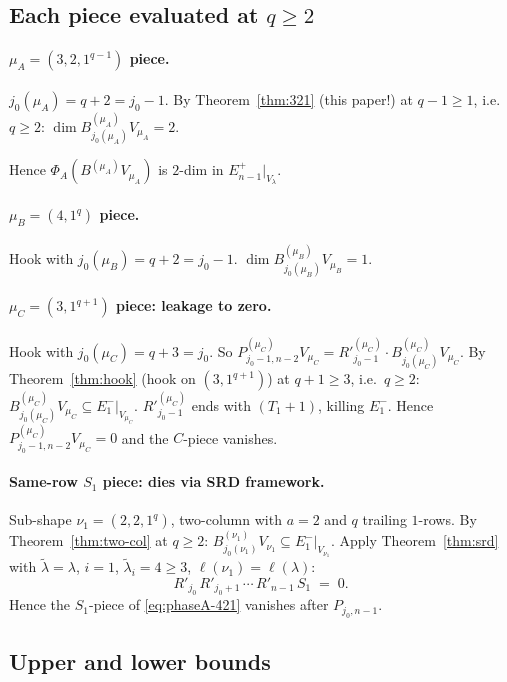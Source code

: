 \documentclass[11pt]{article}
\theoremstyle{definition}
\begin{document}
\subsection{Each piece evaluated at $q \ge 2$}

\paragraph{$\mu_A = (3, 2, 1^{q-1})$ piece.}
$j_0(\mu_A) = q + 2 = j_0 - 1$. By Theorem~\ref{thm:321} (this paper!)
at $q - 1 \ge 1$, i.e.\ $q \ge 2$:
$\dim B^{(\mu_A)}_{j_0(\mu_A)} V_{\mu_A} = 2$.

Hence $\Phi_A(B^{(\mu_A)} V_{\mu_A})$ is $2$-dim in $E_{n-1}^+|_{V_\lambda}$.

\paragraph{$\mu_B = (4, 1^q)$ piece.}
Hook with $j_0(\mu_B) = q + 2 = j_0 - 1$.
$\dim B^{(\mu_B)}_{j_0(\mu_B)} V_{\mu_B} = 1$.

\paragraph{$\mu_C = (3, 1^{q+1})$ piece: leakage to zero.}
Hook with $j_0(\mu_C) = q + 3 = j_0$. So
$P^{(\mu_C)}_{j_0 - 1, n - 2} V_{\mu_C} =
R'^{(\mu_C)}_{j_0 - 1} \cdot B^{(\mu_C)}_{j_0(\mu_C)} V_{\mu_C}$.
By Theorem~\ref{thm:hook} (hook on $(3, 1^{q+1})$) at $q + 1 \ge 3$,
i.e.\ $q \ge 2$:
$B^{(\mu_C)}_{j_0(\mu_C)} V_{\mu_C} \subseteq E_1^-|_{V_{\mu_C}}$.
$R'^{(\mu_C)}_{j_0 - 1}$ ends with $(T_1{+}1)$, killing $E_1^-$. Hence
$P^{(\mu_C)}_{j_0 - 1, n - 2} V_{\mu_C} = 0$ and the $C$-piece vanishes.

\paragraph{Same-row $S_1$ piece: dies via SRD framework.}
Sub-shape $\nu_1 = (2, 2, 1^q)$, two-column with $a = 2$ and
$q$ trailing $1$-rows. By Theorem~\ref{thm:two-col} at $q \ge 2$:
$B^{(\nu_1)}_{j_0(\nu_1)} V_{\nu_1} \subseteq E_1^-|_{V_{\nu_1}}$.
Apply Theorem~\ref{thm:srd} with $\widetilde\lambda = \lambda$,
$i = 1$, $\widetilde\lambda_i = 4 \ge 3$, $\ell(\nu_1) = \ell(\lambda)$:
\[
   R'_{j_0}\, R'_{j_0+1}\, \cdots\, R'_{n-1}\, S_1 \;=\; 0.
\]
Hence the $S_1$-piece of \eqref{eq:phaseA-421} vanishes after
$P_{j_0, n-1}$.

\subsection{Upper and lower bounds}
\end{document}
